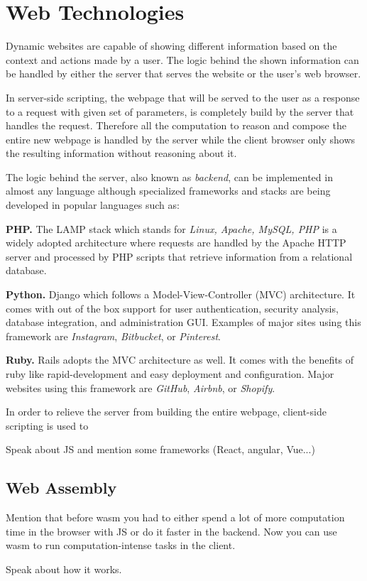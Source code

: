 \section{Web Technologies}
Dynamic websites are capable of showing different information based on the context and actions made by a user. The logic behind the shown information can be handled by either the server that serves the website or the user's web browser. 

In server-side scripting, the webpage that will be served to the user as a response to a request with given set of parameters, is completely build by the server that handles the request. Therefore all the computation to reason and compose the entire new webpage is handled by the server while the client browser only shows the resulting information without reasoning about it.

The logic behind the server, also known as \textit{backend}, can be implemented in almost any language although specialized frameworks and stacks are being developed in popular languages such as:

\textbf{PHP.} The LAMP stack \cite{lamp} which stands for \textit{Linux, Apache, MySQL, PHP} is a widely adopted architecture where requests are handled by the Apache HTTP server and processed by PHP scripts that retrieve information from a relational database.

\textbf{Python.} Django \cite{django} which follows a Model-View-Controller (MVC) architecture. It comes with out of the box support for user authentication, security analysis, database integration, and administration GUI. Examples of major sites using this framework are \textit{Instagram}, \textit{Bitbucket}, or \textit{Pinterest}. \cite{django-websites}

\textbf{Ruby.} Rails adopts the MVC architecture as well. It comes with the benefits of ruby like rapid-development and easy deployment and configuration. Major websites using this framework are \textit{GitHub}, \textit{Airbnb}, or \textit{Shopify}. \cite{rails}

In order to relieve the server from building the entire webpage, client-side scripting is used to  


Speak about JS and mention some frameworks (React, angular, Vue...)


\subsection{Web Assembly}
Mention that before wasm you had to either spend a lot of more computation time in the browser with JS or do it faster in the backend. Now you can use wasm to run computation-intense tasks in the client.

Speak about how it works.